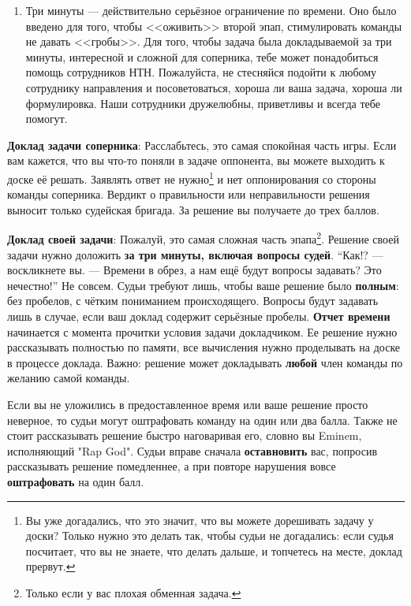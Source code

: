 \documentclass[12pt]{article}
\begin{document}
\begin{enumerate}
\item Три минуты --- действительно серьёзное ограничение по времени. Оно было введено для того, чтобы <<оживить>> второй эпап, стимулировать команды не давать <<гробы>>. Для того, чтобы задача была докладываемой за три минуты, интересной и сложной для соперника, тебе может понадобиться помощь сотрудников НТН. Пожалуйста, не стесняйся подойти к любому сотруднику направления и посоветоваться, хороша ли ваша задача, хороша ли формулировка. Наши сотрудники дружелюбны, приветливы и всегда тебе помогут.
\end{enumerate}
{\bf Доклад задачи соперника}: Расслабьтесь, это самая спокойная часть игры. Если вам кажется, что вы что-то поняли в задаче оппонента, вы можете выходить к доске её решать. Заявлять ответ не нужно\footnote{Вы уже догадались, что это значит, что вы можете дорешивать задачу у доски? Только нужно это делать так, чтобы судьи не догадались: если судья посчитает, что вы не знаете, что делать дальше, и топчетесь на месте, доклад прервут.} и нет оппонирования со стороны команды соперника. Вердикт о правильности или неправильности решения выносит только судейская бригада. За решение вы получаете до трех баллов.

{\bf Доклад своей задачи}: Пожалуй, это самая сложная часть эпапа\footnote{Только если у вас плохая обменная задача.}. Решение своей задачи нужно доложить {\bf за три минуты, включая вопросы судей}. ``Как!? --- воскликнете вы. --- Времени в обрез, а нам ещё будут вопросы задавать? Это нечестно!'' Не совсем. Судьи требуют лишь, чтобы ваше решение было {\bf полным}: без пробелов, с чётким пониманием происходящего. Вопросы будут задавать лишь в случае, если ваш доклад содержит серьёзные пробелы. {\bf Отчет времени} начинается с момента прочитки условия задачи докладчиком. Ее решение нужно рассказывать полностью по памяти, все вычисления нужно проделывать на доске в процессе доклада. Важно: решение может докладывать {\bf любой} член команды по желанию самой команды.

Если вы не уложились в предоставленное время или ваше решение просто неверное, то судьи могут оштрафовать команду на один или два балла. Также не стоит рассказывать решение быстро наговаривая его, словно вы Eminem, исполняющий "Rap God". Судьи вправе сначала {\bf оставновить} вас, попросив рассказывать решение помедленнее, а при повторе нарушения вовсе {\bf оштрафовать} на один балл.
\end{document}
